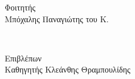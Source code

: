 \begin{minipage}{0.5\textwidth}
\begin{flushleft} \center
Φοιτητής\\[1cm]
Μπόχαλης Παναγιώτης του Κ.\\	
\end{flushleft}
\end{minipage}
~
\begin{minipage}{0.5\textwidth}
\begin{flushright}  \center
Επιβλέπων\\[1cm]
Καθηγητής Κλεάνθης Θραμπουλίδης\\
\end{flushright}
\end{minipage}\\[2cm]

\newpage \thispagestyle{empty} \mbox{}